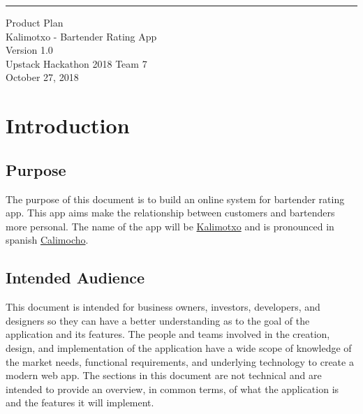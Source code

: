 \documentclass{scrreprt}
\date{}
\def\myversion{1.0}
\begin{document}
\begin{flushright}
    \rule{16cm}{5pt}\vskip1cm
    \begin{bfseries}
        \Huge{Product Plan}\\
        \vspace{1.9cm}
        Kalimotxo - Bartender Rating App\\
        \vspace{1.9cm}
        \LARGE{Version \myversion}\\
        \vspace{1.9cm}
        Upstack Hackathon 2018 Team 7\\
        \vspace{1.9cm}
        October 27, 2018
    \end{bfseries}
\end{flushright}

\tableofcontents


%

\chapter{Introduction}

\section{Purpose}
The purpose of this document is to build an online system for bartender rating app.
This app aims make the relationship between customers and bartenders more personal.
The name of the app will be \hyperlink{https://www.supercall.com/recipe/kalimotxo-drink-recipe}{Kalimotxo} and is pronounced in spanish
\hyperlink{https://forvo.com/word/kalimotxo/}{Calimocho}.

\section{Intended Audience}
This document is intended for business owners, investors, developers, and designers so they can have a better understanding as to the goal of the application and its features. The people and teams involved in the creation, design, and implementation of the application have a wide scope of knowledge of the market needs, functional requirements, and underlying technology to create a modern web app. The sections in this document are not technical and are intended to provide an overview, in common terms, of what the application is and the features it will implement.
\end{document}
